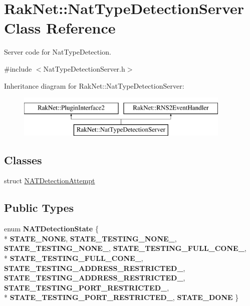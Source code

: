\hypertarget{class_rak_net_1_1_nat_type_detection_server}{\section{Rak\-Net\-:\-:Nat\-Type\-Detection\-Server Class Reference}
\label{class_rak_net_1_1_nat_type_detection_server}
}


Server code for Nat\-Type\-Detection.  




{\ttfamily \#include $<$Nat\-Type\-Detection\-Server.\-h$>$}

Inheritance diagram for Rak\-Net\-:\-:Nat\-Type\-Detection\-Server\-:\begin{figure}[H]
\begin{center}
\leavevmode
\includegraphics[height=2.000000cm]{class_rak_net_1_1_nat_type_detection_server}
\end{center}
\end{figure}
\subsection*{Classes}
\begin{DoxyCompactItemize}
\item 
struct \hyperlink{struct_rak_net_1_1_nat_type_detection_server_1_1_n_a_t_detection_attempt}{N\-A\-T\-Detection\-Attempt}
\end{DoxyCompactItemize}
\subsection*{Public Types}
\begin{DoxyCompactItemize}
\item 
enum {\bfseries N\-A\-T\-Detection\-State} \{ \\*
{\bfseries S\-T\-A\-T\-E\-\_\-\-N\-O\-N\-E}, 
{\bfseries S\-T\-A\-T\-E\-\_\-\-T\-E\-S\-T\-I\-N\-G\-\_\-\-N\-O\-N\-E\-\_}, 
{\bfseries S\-T\-A\-T\-E\-\_\-\-T\-E\-S\-T\-I\-N\-G\-\_\-\-N\-O\-N\-E\-\_}, 
{\bfseries S\-T\-A\-T\-E\-\_\-\-T\-E\-S\-T\-I\-N\-G\-\_\-\-F\-U\-L\-L\-\_\-\-C\-O\-N\-E\-\_}, 
\\*
{\bfseries S\-T\-A\-T\-E\-\_\-\-T\-E\-S\-T\-I\-N\-G\-\_\-\-F\-U\-L\-L\-\_\-\-C\-O\-N\-E\-\_}, 
{\bfseries S\-T\-A\-T\-E\-\_\-\-T\-E\-S\-T\-I\-N\-G\-\_\-\-A\-D\-D\-R\-E\-S\-S\-\_\-\-R\-E\-S\-T\-R\-I\-C\-T\-E\-D\-\_}, 
{\bfseries S\-T\-A\-T\-E\-\_\-\-T\-E\-S\-T\-I\-N\-G\-\_\-\-A\-D\-D\-R\-E\-S\-S\-\_\-\-R\-E\-S\-T\-R\-I\-C\-T\-E\-D\-\_}, 
{\bfseries S\-T\-A\-T\-E\-\_\-\-T\-E\-S\-T\-I\-N\-G\-\_\-\-P\-O\-R\-T\-\_\-\-R\-E\-S\-T\-R\-I\-C\-T\-E\-D\-\_}, 
\\*
{\bfseries S\-T\-A\-T\-E\-\_\-\-T\-E\-S\-T\-I\-N\-G\-\_\-\-P\-O\-R\-T\-\_\-\-R\-E\-S\-T\-R\-I\-C\-T\-E\-D\-\_}, 
{\bfseries S\-T\-A\-T\-E\-\_\-\-D\-O\-N\-E}
 \}
\end{DoxyCompactItemize}

